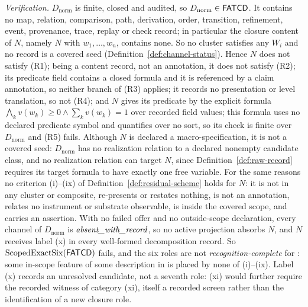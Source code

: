 \begin{remark}
\emph{Verification.} \(D_{\mathrm{norm}}\) is finite, closed and
audited, so \(D_{\mathrm{norm}}\in\mathsf{FATCD}{}\). It contains no map, relation,
comparison, path, derivation, order, transition, refinement, event,
provenance, trace, replay or check record; in particular the closure content
of \(N\), namely \(N\) with \(w_1,\dots,w_n\), contains none. So no cluster
satisfies any \(W_i\)
and no record is a covered seed (Definition~\ref{def:channel-status}). Hence
\(N\) does not satisfy (R1); being a content record, not an annotation, it does not satisfy (R2); its predicate field contains a closed formula and it is referenced by a claim annotation, so neither branch of (R3) applies;
it records no presentation or level translation, so not (R4); and \(N\) gives
its predicate by the explicit formula \(\bigwedge_k v(w_k)\ge0\wedge\sum_k v(w_k)=1\) over recorded field
values; this formula uses no declared predicate symbol and quantifies over no
sort, so its check is finite over \(D_{\mathrm{norm}}\) and (R5) fails.
Although \(N\) is declared a macro-specification, it is not a covered seed:
\(D_{\mathrm{norm}}\) has no realization relation to a declared nonempty
candidate class, and no realization relation can target \(N\), since
Definition~\ref{def:raw-record} requires its target formula to have exactly one
free variable. For the same reasons no
criterion (i)--(ix) of Definition~\ref{def:residual-scheme} holds for \(N\):
it is not in any cluster or composite, re-presents or restates nothing, is not
an annotation, relates no instrument or substrate observable, is inside the
covered scope, and carries an assertion. With no failed offer and no outside-scope declaration,
every channel of \(D_{\mathrm{norm}}\) is \(\textit{absent\_\allowbreak with\_\allowbreak record}\), so no active projection absorbs \(N\), and \(N\) receives
label (x) in every well-formed decomposition record. So \(\operatorname{ScopedExactSix}\!\left(\mathsf{FATCD}{}\right)\)
fails, and the six roles are not \emph{recognition-complete} for \FATCD{}: some in-scope
feature of some description in \FATCD{} is placed by none of (i)--(ix).
Label (x) records an unresolved candidate, not a seventh role: (xi) would
further require the recorded witness of category (xi), itself a recorded
screen rather than the identification of a new closure role.


\end{remark}
